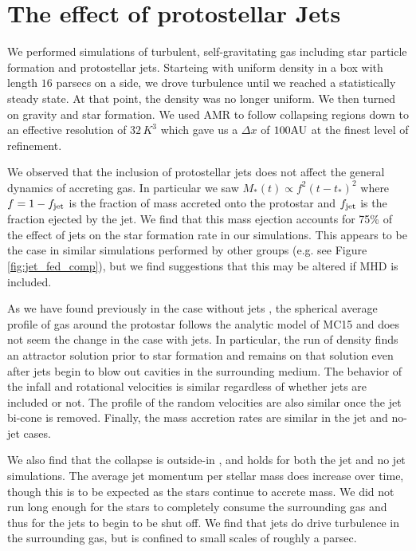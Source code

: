 \documentclass[../dissertation.tex]{subfiles}
\begin{document}
\section{The effect of protostellar Jets}
We performed simulations of turbulent, self-gravitating gas including star particle formation and protostellar jets. 
Starteing with uniform density in a box with length $16$ parsecs on a side, we drove turbulence until we reached a statistically steady state.
At that point, the density was no longer uniform.
We then turned on gravity and star formation.
We used AMR to follow collapsing regions down to an effective resolution of $32 \, K^3$ which gave us a $\Delta x$ of $100 {\rm AU}$ at the finest level of refinement.

We observed that the inclusion of protostellar jets does not affect the general dynamics of accreting gas.
In particular we saw $M_*(t) \propto f^2 (t-t_*)^2$ where $f = 1 - f_{\rm jet}$ is the fraction of mass accreted onto the protostar and $f_{\rm jet}$ is the fraction ejected by the jet.
We find that this mass ejection accounts for 75\% of the effect of jets on the star formation rate in our simulations.
This appears to be the case in similar simulations performed by other groups (e.g. see Figure \ref{fig:jet_fed_comp}), but we find suggestions that this may be altered if MHD is included.

As we have found previously in the case without jets \citep{2017MNRAS.465.1316M}, the spherical average profile of gas around the protostar follows the analytic model of MC15 and does not seem the change in the case with jets.  In particular, the run of density finds an attractor solution prior to star formation and remains on that solution even after jets begin to blow out cavities in the surrounding medium.
The behavior of the infall and rotational velocities is similar regardless of whether jets are included or not.
The profile of the random velocities are also similar once the jet bi-cone is removed.  Finally, the mass accretion rates are similar in the jet and no-jet cases.

We also find that the collapse is outside-in  \citep{2017MNRAS.465.1316M}, and holds for both the jet and no jet simulations.
The average jet momentum per stellar mass does increase over time, though this is to be expected as the stars continue to accrete mass.
We did not run long enough for the stars to completely consume the surrounding gas and thus for the jets to begin to be shut off.
We find that jets do drive turbulence in the surrounding gas, but is confined to small scales of roughly a parsec.
\end{document}
